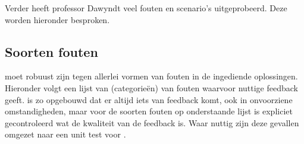 Verder heeft professor Dawyndt veel fouten en scenario's uitgeprobeerd.
Deze worden hieronder besproken.

\subsection{Soorten fouten}\label{subsec:soorten-fouten}

\tested{} moet robuust zijn tegen allerlei vormen van fouten in de ingediende oplossingen.
Hieronder volgt een lijst van (categorieën) van fouten waarvoor \tested{} nuttige feedback geeft.
\tested{} is zo opgebouwd dat er altijd iets van feedback komt, ook in onvoorziene omstandigheden, maar voor de soorten fouten op onderstaande lijst is expliciet gecontroleerd wat de kwaliteit van de feedback is.
Waar nuttig zijn deze gevallen omgezet naar een unit test voor \tested{}.

